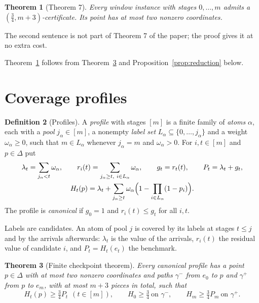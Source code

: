 \documentclass[11pt,a4paper]{article}
\numberwithin{equation}{section}
\newtheorem{theorem}{Theorem}[section]
\theoremstyle{definition}
\newtheorem{definition}[theorem]{Definition}
\newcommand{\tq}{\tfrac34}
\begin{document}
\begin{theorem}[Theorem 7]\label{thm:main}
Every window instance with stages $0,\dots,m$ admits a
$(\frac34,m+3)$-certificate. Its point has at most two nonzero coordinates.
\end{theorem}

The second sentence is not part of Theorem 7 of the paper; the proof gives it
at no extra cost.

Theorem~\ref{thm:main} follows from Theorem~\ref{thm:finite} and
Proposition~\ref{prop:reduction} below.

\section{Coverage profiles}\label{sec:profiles}

\begin{definition}[Profiles]\label{def:profile}
A \emph{profile} with stages $[m]$ is a finite family of \emph{atoms} $\alpha$,
each with a \emph{pool} $j_\alpha\in[m]$, a nonempty \emph{label set}
$L_\alpha\subseteq\{0,\dots,j_\alpha\}$ and a weight $\omega_\alpha\ge0$, such
that $m\in L_\alpha$ whenever $j_\alpha=m$ and $\omega_\alpha>0$. For
$i,t\in[m]$ and $p\in\Delta$ put
\begin{gather*}
\lambda_t=\sum_{j_\alpha<t}\omega_\alpha,\qquad
r_i(t)=\sum_{j_\alpha\ge t,\ i\in L_\alpha}\omega_\alpha,\qquad
g_t=r_t(t),\qquad P_t=\lambda_t+g_t,\\
H_t(p)=\lambda_t+\sum_{j_\alpha\ge t}\omega_\alpha\Bigl(1-\prod_{i\in L_\alpha}(1-p_i)\Bigr).
\end{gather*}
The profile is \emph{canonical} if $g_0=1$ and $r_i(t)\le g_t$ for all $i,t$.
\end{definition}

Labels are candidates. An atom of pool $j$ is covered by its labels at stages
$t\le j$ and by the arrivals afterwards: $\lambda_t$ is the value of the
arrivals, $r_i(t)$ the residual value of candidate $i$, and
$P_t=H_t(e_t)$ the benchmark.

\begin{theorem}[Finite checkpoint theorem]\label{thm:finite}Every canonical profile has a point $p\in\Delta$ with at most two nonzero
coordinates and paths $\gamma^-$ from $e_0$ to $p$ and $\gamma^+$ from $p$ to
$e_m$, with at most $m+3$ pieces in total, such that
\[
H_t(p)\ge\tq P_t\ \ (t\in[m]),\qquad H_0\ge\tq\ \text{on }\gamma^-,\qquad
H_m\ge\tq P_m\ \text{on }\gamma^+.
\]
\end{theorem}
\end{document}
